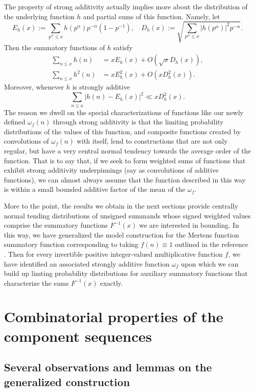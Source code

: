 \documentclass[11pt,reqno,a4letter]{article}
\numberwithin{figure}{section}
\numberwithin{table}{section}
\theoremstyle{plain}
\numberwithin{theorem}{section}
\theoremstyle{definition}
\begin{document}
The property of strong additivity actually implies more about the distribution of the 
underlying function $h$ and partial sums of this function. Namely, let 
\[
E_h(x) := \sum_{p^{\alpha} \leq x} h(p^{\alpha}) p^{-\alpha}(1-p^{-1}), 
     \quad D_h(x) := \sqrt{\sum_{p^{\alpha} \leq x} |h(p^{\alpha})|^2 p^{-\alpha}}. 
\]
Then the summatory functions of $h$ satisfy 
\begin{align*} 
\sum_{n \leq x} h(n) & = x E_h(x) + O\left(\sqrt{x} D_h(x)\right), \\ 
\sum_{n \leq x} h^2(n) & = x E_h^2(x) + O\left(x D_h^2(x)\right). 
\end{align*}
Moreover, whenever $h$ is strongly additive 
\[
\sum_{n \leq x} |h(n) - E_h(x)|^2 \ll x D_h^2(x). 
\]
The reason we dwell on the special characterizations of functions like our 
newly defined $\omega_f(n)$ through strong additivity is that the limiting 
probability distributions of the values of this function, and composite 
functions created by convolutions of $\omega_f(n)$ with itself, 
lend to constructions that are not only regular, but have a very central 
normal tendency towards the average order of the function. 
That is to say that, if we seek to form weighted sums of functions that 
exhibit strong additivity underpinnings (say as convolutions of additive functions), 
we can almost always assume that the function described in this way is within a 
small bounded additive factor of the mean of the $\omega_f$. 

More to the point, the results we obtain in the next sections provide centrally 
normal tending distributions of unsigned summands whose signed weighted values 
comprise the summatory functions $F^{-1}(x)$ we are interested in bounding. 
In this way, we have generalized the model construction for the Mertens function 
summatory function corresponding to taking $f(n) \equiv 1$ outlined in the 
reference \cite{SCHMIDT-MERTENS-2021}. Then for every invertible positive integer-valued 
multiplicative function $f$, we have identified an associated strongly additive 
function $\omega_f$ upon which we can build up limting probability distributions for 
auxiliary summatory functions that characterize the sums $F^{-1}(x)$ exactly. 

\newpage
\section{Combinatorial properties of the component sequences}

\subsection{Several observations and lemmas on the generalized construction} 
\end{document}
